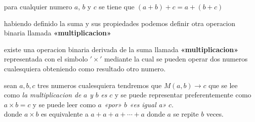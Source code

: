 \documentclass[11pt]{article}
\begin{document}
\begin{flushleft}
\begin{dogma}
    \end{dogma}
    \begin{dogma}
        para cualquier numero $a$, $b$ y $c$ se tiene que $(a+b)+c=a+(b+c)$
    \end{dogma}
    habiendo definido la suma y sus propiedades podemos definir otra operacion binaria llamada \textbf{«multiplicacion»} 
    \begin{definition}
        existe una operacion binaria derivada de la suma llamada \textbf{«multiplicacion»} representada con el simbolo $'\times'$
        mediante la cual se pueden operar dos numeros cualesquiera obteniendo como resultado otro numero.\\
    \end{definition}
    \begin{example}
        sean $a,b,c$ tres numeros cualesquiera tendremos que $M(a,b) \to c$ que se lee como 
        \textit{la multiplicacion de $a$ y $b$ es $c$} y se puede representar preferentemente como $a\times b=c$
        y se puede leer como \textit{ $a$ «por» $b$ «es igual a»  $c$}.\\
        donde $a\times b$ es equivalente a $a+a+a+\cdots+a$ donde $a$ se repite $b$ veces.
    \end{example}

    
\end{flushleft}


\newpage

\medskip

%  

\newpage
\end{document}
